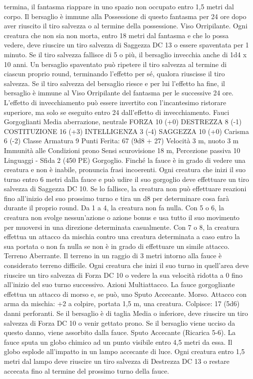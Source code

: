 \begin{multicols}{2}
termina, il fantasma riappare in uno spazio non occupato entro 1,5 metri dal
corpo. Il bersaglio è immune alla Possessione di questo fantasma per 24 ore
dopo aver riuscito il tiro salvezza o al termine della possessione.
Viso Orripilante. Ogni creatura che non sia non morta, entro 18 metri
dal fantasma e che lo possa vedere, deve riuscire un tiro salvezza di
Saggezza DC 13 o essere spaventata per 1 minuto. Se il tiro salvezza
fallisce di 5 o più, il bersaglio invecchia anche di 1d4 x 10 anni. Un
bersaglio spaventato può ripetere il tiro salvezza al termine di ciascun
proprio round, terminando l’effetto per sé, qualora riuscisse il tiro
salvezza. Se il tiro salvezza del bersaglio riesce e per lui l’effetto ha fine, il
bersaglio è immune al Viso Orripilante del fantasma per le successive 24
ore. L’effetto di invecchiamento può essere invertito con l’incantesimo
ristorare superiore, ma solo se eseguito entro 24 dall’effetto di
invecchiamento.
Fauci Gorgoglianti
Media aberrazione, neutrale
FORZA 10 (+0)
DESTREZZA 8 (-1)
COSTITUZIONE 16 (+3)
INTELLIGENZA 3 (-4)
SAGGEZZA 10 (+0)
Carisma 6 (-2)
Classe Armatura 9
\hspace*{0pt}\hfill{Punti Ferita}: 67 (9d8 + 27)
Velocità 3 m, nuoto 3 m
Immunità alle Condizioni prono
Sensi scurovisione 18 m, Percezione passiva 10
Linguaggi -
Sfida 2 (450 PE)
Gorgoglio. Finché la fauce è in grado di vedere una creatura e
non è inabile, pronuncia frasi incoerenti. Ogni creatura che inizi
il suo turno entro 6 metri dalla fauce e può udire il suo gorgoglio
deve effettuare un tiro salvezza di Saggezza DC 10. Se lo
fallisce, la creatura non può effettuare reazioni fino all’inizio del
suo prossimo turno e tira un d8 per determinare cosa farà durante
il proprio round. Da 1 a 4, la creatura non fa nulla. Con 5 o 6, la
creatura non svolge nessun’azione o azione bonus e usa tutto il
suo movimento per muoversi in una direzione determinata
casualmente. Con 7 o 8, la creatura effettua un attacco da
mischia contro una creatura determinata a caso entro la sua
portata o non fa nulla se non è in grado di effettuare un simile
attacco.
Terreno Aberrante. Il terreno in un raggio di 3 metri intorno alla
fauce è considerato terreno difficile. Ogni creatura che inizi il
suo turno in quell’area deve riuscire un tiro salvezza di Forza DC
10 o vedere la sua velocità ridotta a 0 fino all’inizio del suo turno
successivo.
Azioni
Multiattacco. La fauce gorgogliante effettua un attacco di morso
e, se può, uno Sputo Accecante.
Morso. Attacco con arma da mischia: +2 a colpire, portata 1,5
m, una creatura.
Colpisce: 17 (5d6) danni perforanti. Se il bersaglio è di taglia
Media o inferiore, deve riuscire un tiro salvezza di Forza DC 10
o venir gettato prono. Se il bersaglio viene ucciso da questo
danno, viene assorbito dalla fauce.
Sputo Accecante (Ricarica 5-6). La fauce sputa un globo
chimico ad un punto visibile entro 4,5 metri da essa. Il globo
esplode all’impatto in un lampo accecante di luce. Ogni creatura
entro 1,5 metri dal lampo deve riuscire un tiro salvezza di
Destrezza DC 13 o restare accecata fino al termine del prossimo
turno della fauce.
 

\end{multicols}
